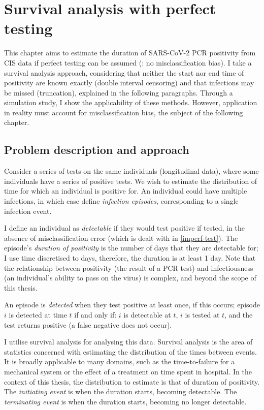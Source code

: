 \documentclass[thesis.tex]{subfiles}
\begin{document}
\chapter{Survival analysis with perfect testing} \label{perf-test}

This chapter aims to estimate the duration of SARS-CoV-2 PCR positivity from CIS data if perfect testing can be assumed (\ie: no misclassification bias).
I take a survival analysis approach, considering that neither the start nor end time of positivity are known exactly (double interval censoring) and that infections may be missed (truncation), explained in the following paragraphs.
Through a simulation study, I show the applicability of these methods.
However, application in reality must account for misclassification bias, the subject of the following chapter.

\section{Problem description and approach}\label{perf-test:sec:data}

Consider a series of tests on the same individuals (longitudinal data), where some individuals have a series of positive tests.
We wish to estimate the distribution of time for which an individual is positive for.
An individual could have multiple infections, in which case define \emph{infection episodes}, corresponding to a single infection event.

I define an individual as \emph{detectable} if they would test positive if tested, in the absence of misclassification error (which is dealt with in \autoref{imperf-test}).
The episode's \emph{duration of positivity} is the number of days that they are detectable for; I use time discretised to days, therefore, the duration is at least 1 day.
Note that the relationship between positivity (\ie the result of a PCR test) and infectiousness (\ie an individual's ability to pass on the virus) is complex,  and beyond the scope of this thesis.

An episode is \emph{detected} when they test positive at least once, if this occurs; episode $i$ is detected at time $t$ if and only if: $i$ is detectable at $t$, $i$ is tested at $t$, and the test returns positive (a false negative does not occur).

I utilise survival analysis for analysing this data.
Survival analysis is the area of statistics concerned with estimating the distribution of the times between events.
It is broadly applicable to many domains, such as the time-to-failure for a mechanical system or the effect of a treatment on time spent in hospital.
In the context of this thesis, the distribution to estimate is that of duration of positivity.
The \emph{initiating event} is when the duration starts, \ie becoming detectable.
The \emph{terminating event} is when the duration starts, \ie becoming no longer detectable.
\end{document}
